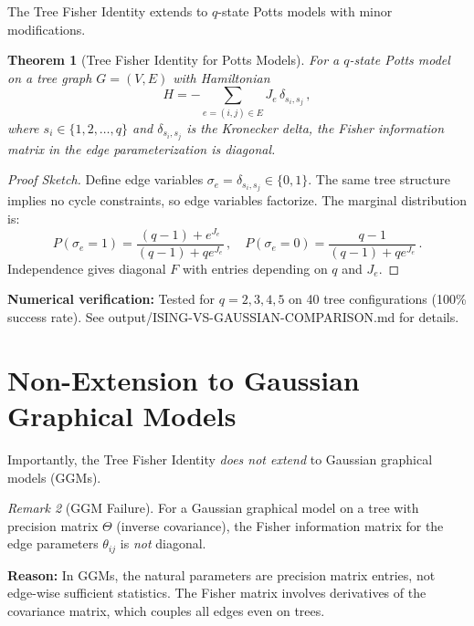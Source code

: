 \documentclass[11pt]{article}
\newtheorem{theorem}{Theorem}
\theoremstyle{definition}
\theoremstyle{remark}
\newtheorem{remark}[theorem]{Remark}
\begin{document}
The Tree Fisher Identity extends to $q$-state Potts models with minor
modifications.

\begin{theorem}[Tree Fisher Identity for Potts Models]
\label{thm:tree-fisher-potts}
For a $q$-state Potts model on a tree graph $G = (V, E)$ with Hamiltonian
\begin{equation}
H = -\sum_{e=(i,j) \in E} J_e\, \delta_{s_i, s_j}\,,
\end{equation}
where $s_i \in \{1, 2, \ldots, q\}$ and $\delta_{s_i, s_j}$ is the
Kronecker delta, the Fisher information matrix in the edge parameterization
is diagonal.
\end{theorem}

\begin{proof}[Proof Sketch]
Define edge variables $\sigma_e = \delta_{s_i, s_j} \in \{0, 1\}$. The
same tree structure implies no cycle constraints, so edge variables
factorize. The marginal distribution is:
\begin{equation}
P(\sigma_e = 1) = \frac{(q-1) + e^{J_e}}{(q-1) + q e^{J_e}}\,,
\quad
P(\sigma_e = 0) = \frac{q-1}{(q-1) + q e^{J_e}}\,.
\end{equation}
Independence gives diagonal $F$ with entries depending on $q$ and $J_e$.
\end{proof}

\textbf{Numerical verification:} Tested for $q = 2, 3, 4, 5$ on 40 tree
configurations (100\% success rate). See output/ISING-VS-GAUSSIAN-COMPARISON.md
for details.

\section{Non-Extension to Gaussian Graphical Models}

Importantly, the Tree Fisher Identity \emph{does not extend} to Gaussian
graphical models (GGMs).

\begin{remark}[GGM Failure]
For a Gaussian graphical model on a tree with precision matrix $\Theta$
(inverse covariance), the Fisher information matrix for the edge parameters
$\theta_{ij}$ is \emph{not} diagonal.
\end{remark}

\textbf{Reason:} In GGMs, the natural parameters are precision matrix
entries, not edge-wise sufficient statistics. The Fisher matrix involves
derivatives of the covariance matrix, which couples all edges even on trees.
\end{document}
